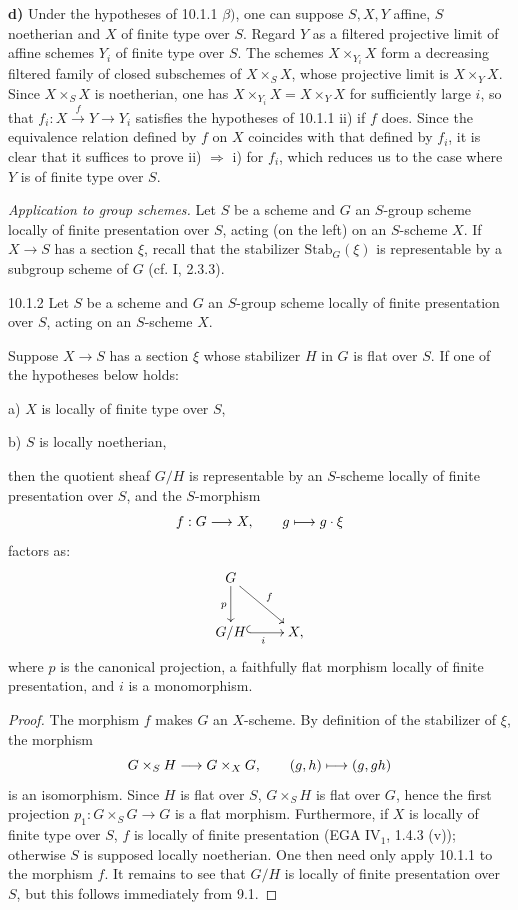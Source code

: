 \textbf{d)} Under the hypotheses of 10.1.1 $\beta)$, one can suppose $S,X,Y$ affine, $S$ noetherian and $X$ of finite type over $S$. Regard $Y$ as a filtered projective limit of affine schemes $Y_i$ of finite type over $S$. The schemes $X\times_{Y_i}X$ form a decreasing filtered family of closed subschemes of $X\times_SX$, whose projective limit is $X\times_YX$. Since $X\times_SX$ is noetherian, one has $X\times_{Y_i}X=X\times_YX$ for sufficiently large $i$, so that $f_i:X\xrightarrow{f}Y\to Y_i$ satisfies the hypotheses of 10.1.1 ii) if $f$ does. Since the equivalence relation defined by $f$ on $X$ coincides with that defined by $f_i$, it is clear that it suffices to prove ii) $\Rightarrow$ i) for $f_i$, which reduces us to the case where $Y$ is of finite type over $S$.

\emph{Application to group schemes.} Let $S$ be a scheme and $G$ an $S$-group scheme locally of finite presentation over $S$, acting (on the left) on an $S$-scheme $X$. If $X\to S$ has a section $\xi$, recall that the stabilizer $\mathrm{Stab}_G(\xi)$ is representable by a subgroup scheme of $G$ (cf. I, 2.3.3).
\begin{theorem}{10.1.2}\label{V.10.1.2}
Let $S$ be a scheme and $G$ an $S$-group scheme locally of finite presentation over $S$, acting on an $S$-scheme $X$.

Suppose $X\to S$ has a section $\xi$ whose stabilizer $H$ in $G$ is flat over $S$. If one of the hypotheses below holds:

\textup{a)} $X$ is locally of finite type over $S$,

\textup{b)} $S$ is locally noetherian,

then the quotient \fppf sheaf $G/H$ is representable by an $S$-scheme locally of finite presentation over $S$, and the $S$-morphism
\[
f:G\longrightarrow X,\qquad g\longmapsto g\cdot\xi
\]
factors as:
\[
\xymatrix{G\ar[d]_p\ar[dr]^f&\\G/H\ar@{^{(}->}[r]_i&X,}
\]
where $p$ is the canonical projection, a faithfully flat morphism locally of finite presentation, and $i$ is a monomorphism.
\end{theorem}
\begin{proof}
The morphism $f$ makes $G$ an $X$-scheme. By definition of the stabilizer of $\xi$, the morphism
\[
G\times_SH\longrightarrow G\times_XG,\qquad(g,h)\longmapsto(g,gh)
\]
is an isomorphism. Since $H$ is flat over $S$, $G\times_SH$ is flat over $G$, hence the first projection $p_1:G\times_SG\to G$ is a flat morphism. Furthermore, if $X$ is locally of finite type over $S$, $f$ is locally of finite presentation (EGA IV$_1$, 1.4.3 (v)); otherwise $S$ is supposed locally noetherian. One then need only apply 10.1.1 to the morphism $f$. It remains to see that $G/H$ is locally of finite presentation over $S$, but this follows immediately from 9.1.
\end{proof}
